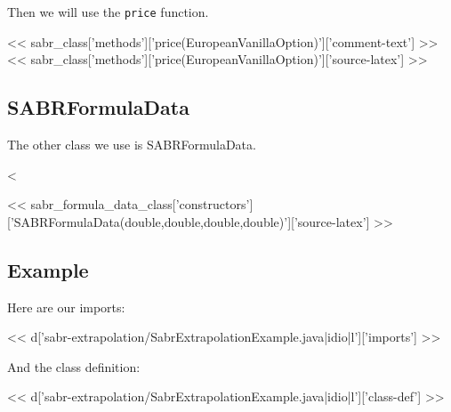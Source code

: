Then we will use the \verb|price| function.

<< sabr_class['methods']['price(EuropeanVanillaOption)']['comment-text'] >>
<< sabr_class['methods']['price(EuropeanVanillaOption)']['source-latex'] >>

\subsection{SABRFormulaData}

The other class we use is SABRFormulaData.

<%

<< sabr_formula_data_class['constructors']['SABRFormulaData(double,double,double,double)']['source-latex'] >>

\subsection{Example}

Here are our imports:

<< d['sabr-extrapolation/SabrExtrapolationExample.java|idio|l']['imports'] >>

And the class definition:

<< d['sabr-extrapolation/SabrExtrapolationExample.java|idio|l']['class-def'] >>


